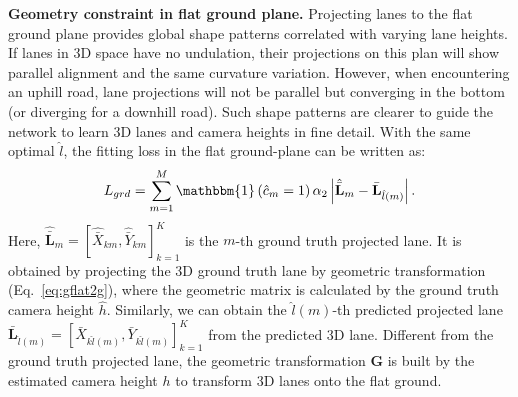 \documentclass[letterpaper]{article} \usepackage{aaai22}  \usepackage{times}  \usepackage{helvet}  \usepackage{courier}  \usepackage[hyphens]{url}  \usepackage{graphicx} \urlstyle{rm} \def\UrlFont{\rm}  \usepackage{natbib}  \usepackage{caption}
\begin{document}
\noindent \textbf{Geometry constraint in flat ground plane.}
Projecting lanes to the flat ground plane provides global shape patterns correlated with varying lane heights. If lanes in 3D space have no undulation, their projections on this plan will show parallel alignment and the same curvature variation. However, when encountering an uphill road, lane projections will not be parallel but converging in the bottom (or diverging for a downhill road). Such shape patterns are clearer to guide the network to learn 3D lanes and camera heights in fine detail. With the same optimal $\hat{l}$,  the fitting loss in the flat ground-plane can be written as:
\begin{equation}
\label{lossingflat}
\begin{split}
L_{grd} = \sum_{m=1}^M \mathbbm{1}\left(\hat{c}_m = 1\right) \alpha_2 \left|\hat{\bar{\mathbf{L}}}_m - \bar{\mathbf{L}}_{\hat{l}\left(m\right)} \right|.
\end{split}
\end{equation}
Here, $\hat{\bar{\mathbf{L}}}_m=\left[\hat{\bar{X}}_{km},\hat{\bar{Y}}_{km}\right]_{k=1}^K$ is the $m$-th ground truth projected lane.  It is obtained by projecting the 3D ground truth lane by geometric transformation (Eq.~\ref{eq:gflat2g}), where the geometric matrix is calculated by the ground truth camera height $\hat{h}$. Similarly, we can obtain the $\hat{l}\left(m\right)$-th predicted projected lane $\bar{\mathbf{L}}_{\hat{l}\left(m\right)}=\left[\bar{X}_{k\hat{l}\left(m\right)},\bar{Y}_{k\hat{l}\left(m\right)}\right]_{k=1}^K$ from the predicted 3D lane. Different from the ground truth projected lane, the geometric transformation $\mathbf{G}$ is built by the estimated camera height $h$ to transform 3D lanes onto the flat ground.
\end{document}
